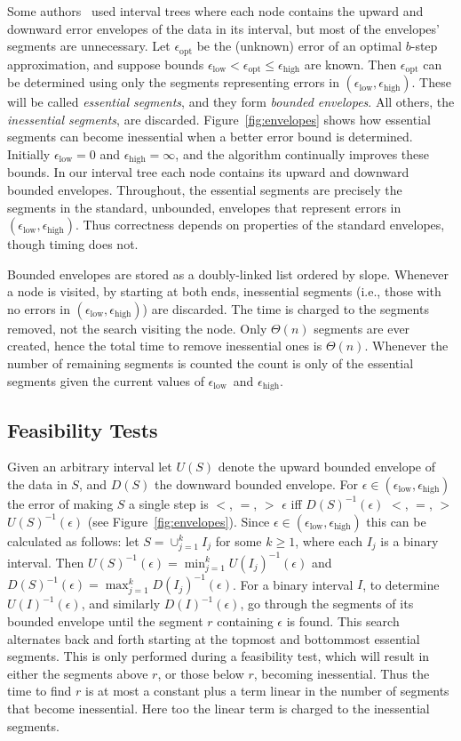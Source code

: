 \documentclass[11pt]{article}
\newcommand{\epslow}{\ensuremath{\epsilon_\mathrm{low}}}
\newcommand{\epshigh}{\ensuremath{\epsilon_\mathrm{high}}}
\newcommand{\epsopt}{\ensuremath{\epsilon_\mathrm{opt}}}
\newcommand{\epsinterval}[1]{\ensuremath{(\epslow,\epshigh#1}}
\begin{document}
Some authors~\cite{ChenWangPiecewise2013,FournierVigneronLinftyStep,GuhaShimLinftyHistogram} used interval trees where each node 
contains the upward and downward error envelopes of the data in its interval, but most of the envelopes' segments are unnecessary.
Let $\epsopt$ be the (unknown) error of an optimal $b$-step approximation,
and suppose bounds $\epslow < \epsopt \leq \epshigh$ are known.
Then $\epsopt$ can be determined using only the segments representing errors in \epsinterval{)}.
These will be called \textit{essential segments}, and they form \textit{bounded envelopes}.
All others, the \textit{inessential segments}, are discarded.
Figure~\ref{fig:envelopes} shows how essential segments can become inessential when a better error bound is determined.
Initially $\epslow=0$ and $\epshigh=\infty$, and the algorithm continually improves these bounds.
In our interval tree each node contains its upward and downward bounded envelopes.
Throughout, the essential segments are precisely the segments in the standard, unbounded, envelopes that represent errors in \epsinterval{)}.
Thus correctness depends on properties of the standard envelopes, though timing does not.

Bounded envelopes are stored as a doubly-linked list ordered by slope.
Whenever a node is visited, by starting at both ends, inessential segments (i.e., those with no errors in \epsinterval{)}) are discarded.
The time is charged to the segments removed, not the search visiting the node.
Only $\Theta(n)$ segments are ever created, hence the total time to remove inessential ones is $\Theta(n)$.
Whenever the number of remaining segments is counted the count is only of the essential segments given the current values of \epslow\ and \epshigh.



\subsection{Feasibility Tests} \label{sec:feasibility}


Given an arbitrary interval let $U(S)$ denote the upward bounded envelope of the data in $S$, and $D(S)$ the downward bounded envelope. 
For $\epsilon \in \epsinterval{)}$ the error of making $S$ a single step is $<$, $=$, $>$ $\epsilon$ iff $D(S)^{-1}(\epsilon)$ $<$, $=$, $>$ $U(S)^{-1}(\epsilon)$
(see Figure~\ref{fig:envelopes}).
Since $\epsilon \in \epsinterval{)}$ this can be calculated as follows:
let $S=\cup_{j=1}^k I_j$ for some $k\geq 1$, where each $I_j$ is a binary interval.
Then $U(S)^{-1}(\epsilon) = \min_{j=1}^k U(I_j)^{-1}(\epsilon)$ and $D(S)^{-1}(\epsilon) = \max_{j=1}^k D(I_j)^{-1}(\epsilon)$.
For a binary interval $I$, to determine $U(I)^{-1}(\epsilon)$, and similarly $D(I)^{-1}(\epsilon)$, go through the segments of its bounded envelope until the segment $r$ containing $\epsilon$ is found.
This search
alternates back and forth starting at the topmost and bottommost essential segments.
This is only performed during a feasibility test, which will result in either the segments above $r$, or those below $r$, becoming inessential.
Thus the time to find $r$ is at most a constant plus a term linear in the number of segments that become inessential.
Here too the linear term is charged to the inessential segments.
\end{document}
